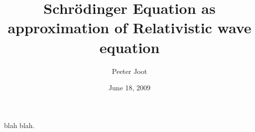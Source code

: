 \documentclass[]{eliblog}
\title{Schr\"{o}dinger Equation as approximation of Relativistic wave equation}
\author{Peeter Joot}
\date{June 18, 2009}
\begin{document}

blah blah.

%
%
\end{document}
